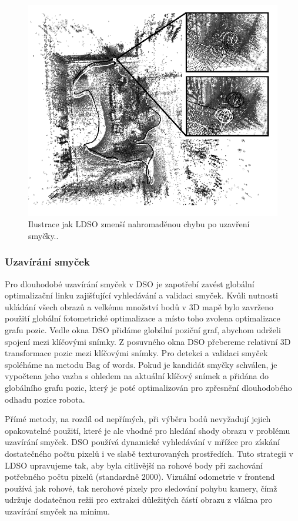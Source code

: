\documentclass[12pt,a4paper]{article}
\begin{document}
\begin{figure}[H]
\centering
\includegraphics[scale=0.75]{img/Obr6_b.png}
\caption{Ilustrace jak LDSO zmenší nahromaděnou chybu po uzavření smyčky.\cite{LDSO}.}
\end{figure}

\subsubsection*{Uzavírání smyček}
Pro dlouhodobé uzavírání smyček v DSO je zapotřebí zavést globální optimalizační linku zajišťující vyhledávání a validaci smyček. Kvůli nutnosti ukládání všech obrazů a velkému množství bodů v 3D mapě bylo zavrženo použití globální fotometrické optimalizace a místo toho zvolena optimalizace grafu pozic. Vedle okna DSO přidáme globální poziční graf, abychom udrželi spojení mezi klíčovými snímky. Z posuvného okna DSO přebereme relativní 3D transformace pozic mezi klíčovými snímky. Pro detekci a validaci smyček spoléháme na metodu Bag of words. Pokud je kandidát smyčky schválen, je vypočtena jeho vazba s ohledem na aktuální klíčový snímek a přidána do globálního grafu pozic, který je poté optimalizován pro zpřesnění dlouhodobého odhadu pozice robota.

Přímé metody, na rozdíl od nepřímých, při výběru bodů nevyžadují jejich opakovatelné použití, které je ale vhodné pro hledání shody obrazu v problému uzavírání smyček. DSO používá dynamické vyhledávání v mřížce pro získání dostatečného počtu pixelů i ve slabě texturovaných prostředích. Tuto strategii v LDSO upravujeme tak, aby byla citlivější na rohové body při zachování potřebného počtu pixelů (standardně 2000). Vizuální odometrie v frontend používá jak rohové, tak nerohové pixely pro sledování pohybu kamery, čímž udržuje dodatečnou režii pro extrakci důležitých částí obrazu z vlákna pro uzavírání smyček na minimu.
\end{document}
